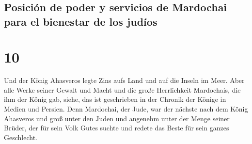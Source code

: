 \hypertarget{posiciuxf3n-de-poder-y-servicios-de-mardochai-para-el-bienestar-de-los-juduxedos}{%
\subsection{Posición de poder y servicios de Mardochai para el bienestar
de los
judíos}\label{posiciuxf3n-de-poder-y-servicios-de-mardochai-para-el-bienestar-de-los-juduxedos}}

\hypertarget{section-9}{%
\section{10}\label{section-9}}

 Und der König Ahasveros legte Zins aufs Land und auf die
Inseln im Meer.  Aber alle Werke seiner Gewalt und Macht
und die große Herrlichkeit Mardochais, die ihm der König gab, siehe, das
ist geschrieben in der Chronik der Könige in Medien und Persien.
 Denn Mardochai, der Jude, war der nächste nach dem König
Ahasveros und groß unter den Juden und angenehm unter der Menge seiner
Brüder, der für sein Volk Gutes suchte und redete das Beste für sein
ganzes Geschlecht.
